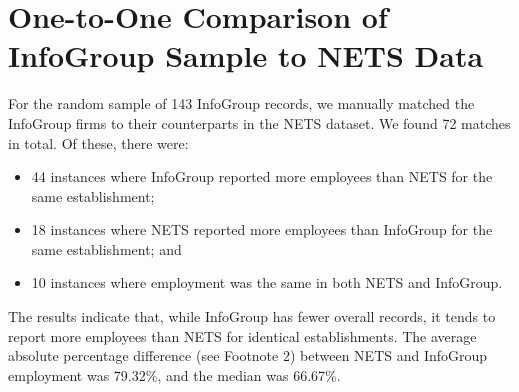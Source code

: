 \documentclass[paper = letter, fontsize = 11pt]{scrartcl}
\begin{document}
\section{One-to-One Comparison of InfoGroup Sample to NETS Data}
For the random sample of 143 InfoGroup records, we manually matched the InfoGroup firms to their counterparts in the NETS dataset. We found 72 matches in total. Of these, there were:
\begin{itemize}
	\item 44 instances where InfoGroup reported more employees than NETS for the same establishment;
	\item 18 instances where NETS reported more employees than InfoGroup for the same establishment; and
	\item 10 instances where employment was the same in both NETS and InfoGroup.
\end{itemize}
The results indicate that, while InfoGroup has fewer overall records, it tends to report more employees than NETS for identical establishments. The average absolute percentage difference (see Footnote 2) between NETS and InfoGroup employment was 79.32\%, and the median was 66.67\%.
\end{document}
